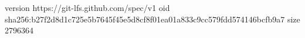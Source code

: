 version https://git-lfs.github.com/spec/v1
oid sha256:b27f2d8d1c725e5b7645f45e5d8cf8f01ea01a833c9cc579fdd574146bcfb9a7
size 2796364
